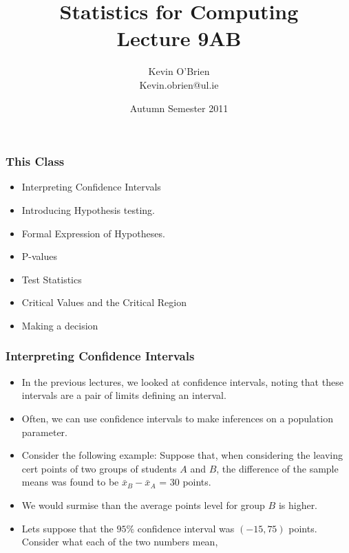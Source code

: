 ﻿\documentclass[a4]{beamer}
\title[MA4413]{Statistics for Computing \\ {\normalsize Lecture 9AB}}
\author[Kevin O'Brien]{Kevin O'Brien \\ {\scriptsize Kevin.obrien@ul.ie}}
\date{Autumn Semester 2011}
\institute[Maths \& Stats]{Dept. of Mathematics \& Statistics, \\ University \textit{of} Limerick}
\begin{document}
\begin{frame}
\titlepage
\end{frame}
\begin{frame}
\frametitle{This Class}
\begin{itemize}
\item Interpreting Confidence Intervals
\item Introducing Hypothesis testing.
\item Formal Expression of Hypotheses.
\item P-values
\item Test Statistics
\item Critical Values and the Critical Region
\item Making a decision
\end{itemize}
\end{frame}


\begin{frame}
\frametitle{Interpreting Confidence Intervals}
\begin{itemize}
\item In the previous lectures, we looked at confidence intervals, noting that these intervals are a pair of limits defining an interval.
\item Often, we can use confidence intervals to make inferences on a population parameter.
\item Consider the following example: Suppose that, when considering the leaving cert points of two groups of students $A$ and $B$, the difference of the sample means was found to be $\bar{x}_B-\bar{x}_A$ = 30 points.
\item We would surmise than the average points level for group $B$ is higher.
\item Lets suppose that the $95\%$ confidence interval was $(-15,75)$ points. Consider what each of the two numbers mean,
\end{itemize}
\end{frame}
\end{document}
